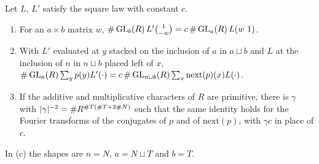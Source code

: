 \begin{proposition}\label{prop:square-law}
Let $L$, $L'$ satisfy the square law with constant $c$.
\begin{enumerate}[label=\textup{(\alph*)}]
\item For an $a\times b$ matrix $w$, $\#\GL_b(R)\,L'\binom1{-w}=c\,\#\GL_a(R)\,L(w\ 1)$.
\item With $L'$ evaluated at $y$ stacked on the inclusion of $a$ in $a\sqcup b$ and $L$ at the inclusion of $n$ in $n\sqcup b$ placed left of $x$, $\#\operatorname{GL}_a(R)\sum_yp(y)L'(\cdot)=c\,\#\operatorname{GL}_{n\sqcup b}(R)\sum_x\mathrm{next}(p)(x)L(\cdot)$.
\item If the additive and multiplicative characters of $R$ are primitive, there is $\gamma$ with $\lvert \gamma\rvert^{-2}=\#R^{\#T(\#T+2\#N)}$ such that the same identity holds for the Fourier transforms of the
conjugates of $p$ and of $\mathrm{next}(p)$, with $\gamma c$ in place of $c$.
\end{enumerate}
\end{proposition}

In (c) the shapes are $n=N$, $a=N\sqcup T$ and $b=T$.

